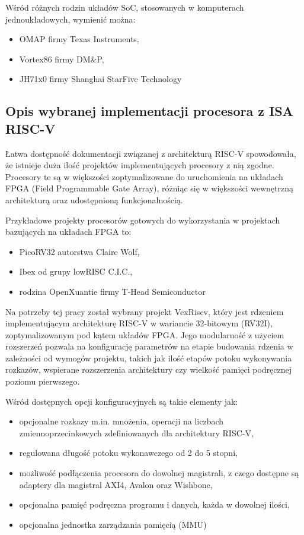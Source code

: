 Wśród różnych rodzin układów SoC, stosowanych w komputerach jednoukładowych, wymienić można:
\begin{itemize}
	\item OMAP\cite{omap3530} firmy Texas Instruments,
	\item Vortex86\cite{vortex86ex2} firmy DM\&P,
	\item JH71x0\cite{jh7110} firmy Shanghai StarFive Technology
\end{itemize}

\subsection{Opis wybranej implementacji procesora z ISA RISC-V}

Łatwa dostępność dokumentacji związanej z architekturą RISC-V spowodowała, że istnieje duża ilość projektów implementujących procesory z nią zgodne. Procesory te są w większości zoptymalizowane do uruchomienia na układach FPGA (Field Programmable Gate Array), różniąc się w większości wewnętrzną architekturą oraz udostępnioną funkcjonalnością.

Przykładowe projekty procesorów gotowych do wykorzystania w projektach bazujących na układach FPGA to:
\begin{itemize}
	\item PicoRV32\cite{picorv32} autorstwa Claire Wolf,
	\item Ibex\cite{ibex} od grupy lowRISC C.I.C.,
	\item rodzina OpenXuantie\cite{openxuantie} firmy T-Head Semiconductor
\end{itemize}

Na potrzeby tej pracy został wybrany projekt VexRiscv\cite{vexriscv:2018:Online}, który jest rdzeniem implementującym architekturę RISC-V\cite{Waterman:EECS-2014-54} w wariancie 32-bitowym (RV32I), zoptymalizowanym pod kątem układów FPGA. Jego modularność z użyciem rozszerzeń pozwala na konfigurację parametrów na etapie budowania rdzenia w zależności od wymogów projektu, takich jak ilość etapów potoku wykonywania rozkazów, wspierane rozszerzenia architektury czy wielkość pamięci podręcznej poziomu pierwszego.

Wśród dostępnych opcji konfiguracyjnych są takie elementy jak:
\begin{itemize}
	\item opcjonalne rozkazy m.in. mnożenia, operacji na liczbach zmiennoprzecinkowych zdefiniowanych dla architektury RISC-V,
	\item regulowana długość potoku wykonawczego od 2 do 5 stopni,
	\item możliwość podłączenia procesora do dowolnej magistrali, z czego dostępne są adaptery dla magistral AXI4, Avalon oraz Wishbone,
	\item opcjonalna pamięć podręczna programu i danych, każda w dowolnej ilości,
	\item opcjonalna jednostka zarządzania pamięcią (MMU)
\end{itemize}

